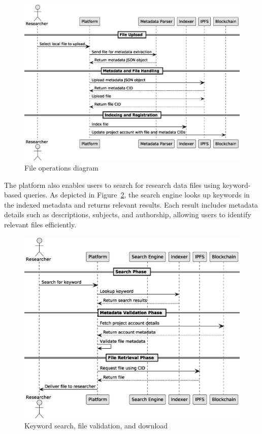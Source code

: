 \documentclass[final]{rc-book-2.14}
\begin{document}
\begin{figure}[htbp]
    \centering
    \includegraphics[scale=0.5]{fig/c4_platform_operations_3.eps}
    \caption{File operations diagram}
    \label{fig:c4_file_operations_diagram}
\end{figure}

The platform also enables users to search for research data files using keyword-based queries. As depicted in Figure~\ref{fig:c4_keyword_search}, the search engine looks up keywords in the indexed metadata and returns relevant results. Each result includes metadata details such as descriptions, subjects, and authorship, allowing users to identify relevant files efficiently.

\begin{figure}[htbp]
    \centering
    \includegraphics[scale=0.5]{fig/c4_searching_and_validation_2.eps}
    \caption{Keyword search, file validation, and download}
    \label{fig:c4_keyword_search}
\end{figure}
\end{document}
